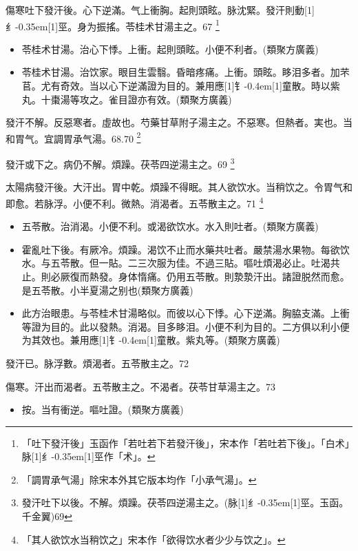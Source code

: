 \documentclass[oneside,b4paper]{ctexbook}
\begin{document}
\begin{flushleft}
傷寒吐下發汗後。心下逆滿。气上衝胸。起則頭眩。脉沈緊。發汗則動{\hbox{\scalebox{0.68}[1]{纟}\kern-0.35em\scalebox{0.64}[1]{巠}}}。身为振搖。苓桂术甘湯主之。67
\footnote{「吐下發汗後」玉函作「若吐若下若發汗後」，宋本作「若吐若下後」。「白术」脉{\hbox{\scalebox{0.68}[1]{纟}\kern-0.35em\scalebox{0.64}[1]{巠}}}作「术」。}

\begin{itemize}
\item 苓桂术甘湯。治心下悸。上衝。起則頭眩。小便不利者。(類聚方廣義)
\item 苓桂术甘湯。治饮家。眼目生雲翳。昏暗疼痛。上衝。頭眩。眵泪多者。加芣苢。尤有奇效。当以心下逆滿證为目的。兼用應{\hbox{\scalebox{0.7}[1]{钅}\kern-0.4em\scalebox{0.7}[1]{童}}}散。時以紫丸。十棗湯等攻之。雀目證亦有效。(類聚方廣義)
\end{itemize}

發汗不解。反惡寒者。虛故也。芍藥甘草附子湯主之。不惡寒。但熱者。実也。当和胃气。宜調胃承气湯。68.70
\footnote{「調胃承气湯」除宋本外其它版本均作「小承气湯」。}

發汗或下之。病仍不解。煩躁。茯苓四逆湯主之。69
\footnote{發汗吐下以後。不解。煩躁。茯苓四逆湯主之。(脉{\hbox{\scalebox{0.68}[1]{纟}\kern-0.35em\scalebox{0.64}[1]{巠}}}。玉函。千金翼)69}

太陽病發汗後。大汗出。胃中乾。煩躁不得眠。其人欲饮水。当稍饮之。令胃气和即愈。若脉浮。小便不利。微熱。消渴者。五苓散主之。71
\footnote{「其人欲饮水当稍饮之」宋本作「欲得饮水者少少与饮之」。}

\begin{itemize}
\item 五苓散。治消渴。小便不利。或渴欲饮水。水入則吐者。(類聚方廣義)
\item 霍亂吐下後。有厥冷。煩躁。渴饮不止而水藥共吐者。嚴禁湯水果物。每欲饮水。与五苓散。但一貼。二三次服为佳。不過三貼。嘔吐煩渴必止。吐渴共止。則必厥復而熱發。身体惰痛。仍用五苓散。則漐漐汗出。諸證脱然而愈。是五苓散。小半夏湯之别也(類聚方廣義)
\item 此方治眼患。与苓桂术甘湯略似。而彼以心下悸。心下逆滿。胸脇支滿。上衝等證为目的。此以發熱。消渴。目多眵泪。小便不利为目的。二方俱以利小便为其效也。兼用應{\hbox{\scalebox{0.7}[1]{钅}\kern-0.4em\scalebox{0.7}[1]{童}}}散。紫丸等。(類聚方廣義)
\end{itemize}

發汗已。脉浮數。煩渴者。五苓散主之。72

傷寒。汗出而渴者。五苓散主之。不渴者。茯苓甘草湯主之。73

\begin{itemize}
\item 按。当有衝逆。嘔吐證。(類聚方廣義)
\end{itemize}


\end{flushleft}
\end{document}
